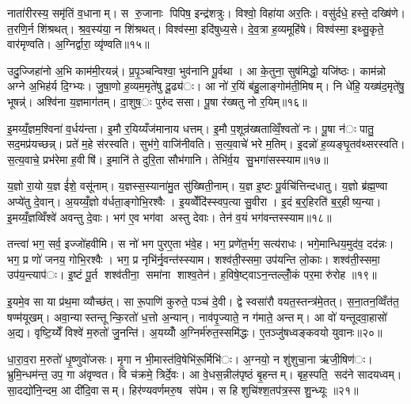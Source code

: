 नाता॑रीरस्य॒ समृ॑तिं व॒धानाम्। स रु॒जानाः पिपिष॒ इन्द्र॑शत्रुः। विश्वो॒ विहा॑या अर॒तिः। वसु॑र्दधे॒ हस्ते॒ दख्षि॑णे। त॒रणि॒र्न शि॑श्रथत्। श्र॒व॒स्य॑या॒ न शि॑श्रथत्। विश्व॑स्मा॒ इदि॑षुध्य॒से। दे॒व॒त्रा ह॒व्यमूहि॑षे। विश्व॑स्मा॒ इथ्सु॒कृते॒ वार॑मृण्वति। अ॒ग्निर्द्वारा॒ व्यृ॑ण्वति॥१५॥

उदु॒ज्जिहा॑नो अ॒भि काम॑मी॒रयन्न्॑। प्र॒पृ॒ञ्चन्विश्वा॒ भुव॑नानि पू॒र्वथा। आ के॒तुना॒ सुष॑मिद्धो॒ यजि॑ष्ठः। काम॑न्नो अग्ने अ॒भिह॑र्य दि॒ग्भ्यः। जु॒षा॒णो ह॒व्यम॒मृते॑षु दू॒ढ्य॑ः। आ नो॑ र॒यिं ब॑हु॒लाङ्गोम॑ती॒मिषम्। नि धे॑हि॒ यख्ष॑द॒मृते॑षु॒ भूषन्न्॑। अश्वि॑ना य॒ज्ञमाग॑तम्। दा॒शुष॒ः पुरु॑दससा। पू॒षा र॑ख्षतु नो र॒यिम्॥१६॥

इ॒मय्यँ॒ज्ञम॒श्विना॑ व॒र्धय॑न्ता। इ॒मौ र॒यिय्यँज॑मानाय धत्तम्। इ॒मौ प॒शून्र॑ख्षताव्विँ॒श्वतो॑ नः। पू॒षा न॑ः पातु॒ सद॒मप्र॑यच्छन्न्। प्रते॑ म॒हे स॑रस्वति। सुभ॑गे॒ वाजि॑नीवति। स॒त्य॒वाचे॑ भरे म॒तिम्। इ॒दन्नो॑ ह॒व्यङ्घृ॒तव॑थ्सरस्वति। स॒त्य॒वाचे॒ प्रभ॑रेमा ह॒वीषि॑। इ॒मानि॑ ते दुरि॒ता सौभ॑गानि। तेभि॑र्व॒य सु॒भगा॑सस्स्याम॥१७॥


य॒ज्ञो रा॒यो य॒ज्ञ ई॑शे॒ वसू॑नाम्। य॒ज्ञस्स॒स्याना॑मु॒त सु॑ख्षिती॒नाम्। य॒ज्ञ इ॒ष्टः पू॒र्वचि॑त्तिन्दधातु। य॒ज्ञो ब्र॑ह्म॒ण्वा अप्ये॑तु दे॒वान्। अ॒यय्यँ॒ज्ञो व॑र्धता॒ङ्गोभि॒रश्वैः। इ॒यव्वेँदि॑स्स्वप॒त्या सु॒वीरा। इ॒दं ब॒र्॒हिरति॑ ब॒र्॒हीष्य॒न्या। इ॒मय्यँ॒ज्ञव्विँश्वे॑ अवन्तु दे॒वाः। भग॑ ए॒व भग॑वा अस्तु देवाः। तेन॑ व॒यं भग॑वन्तस्स्याम॥१८॥

तन्त्वा॑ भग॒ सर्व॒ इज्जो॑हवीमि। स नो॑ भग पुरए॒ता भ॑वे॒ह। भग॒ प्रणे॑त॒र्भग॒ सत्य॑राधः। भगे॒मान्धिय॒मुद॑व॒ दद॑न्नः। भग॒ प्र णो॑ जनय॒ गोभि॒रश्वैः। भग॒ प्र नृभि॑र्नृ॒वन्त॑स्स्याम। शश्व॑ती॒स्समा॒ उप॑यन्ति लो॒काः। शश्व॑ती॒स्समा॒ उप॑य॒न्त्याप॑ः। इ॒ष्टं पू॒र्त शश्व॑तीना॒ समा॑ना शाश्व॒तेन॑। ह॒विषे॒ष्ट्वाऽन॒न्तल्लोँ॒कं पर॒मा रु॑रोह ॥१९॥

इ॒यमे॒व सा या प्र॑थ॒मा व्यौच्छ॑त्। सा रू॒पाणि॑ कुरुते॒ पञ्च॑ दे॒वी। द्वे स्वसा॑रौ वयत॒स्तन्त्र॑मे॒तत्। स॒ना॒तन॒व्विँत॑त॒ षण्म॑यूखम्। अवा॒न्यास्तन्तून्कि॒रतो॑ ध॒त्तो अ॒न्यान्। नाव॑पृ॒ज्याते॒ न ग॑माते॒ अन्तम्। आ वो॑ यन्तूदवा॒हासो॑ अ॒द्य। वृष्टि॒य्येँ विश्वे॑ म॒रुतो॑ जु॒नन्ति॑। अ॒यय्योँ अ॒ग्निर्म॑रुत॒स्समि॑द्धः। ए॒तञ्जु॑षध्वङ्कवयो युवानः॥२०॥

धा॒रा॒व॒रा म॒रुतो॑ धृ॒ष्णुवो॑जसः। मृ॒गा न भी॒मास्त॑वि॒षेभि॑रू॒र्मिभि॑ः। अ॒ग्नयो॒ न शु॑शुचा॒ना ऋ॑जी॒षिण॑ः। भ्रुमि॒न्धम॑न्त॒ उप॒ गा अ॑वृण्वत। वि च॑क्रमे॒ त्रिर्दे॒वः। आ वे॒धस॒न्नील॑पृष्ठं बृ॒हन्तम्। बृह॒स्पति॒ सद॑ने सादयध्वम्। सा॒दद्यो॑नि॒न्दम॒ आ दी॑दि॒वासम्। हिर॑ण्यवर्णमरु॒ष स॑पेम। स हि शुचि॑श्श॒तप॑त्र॒स्स शु॒न्ध्यूः ॥२१॥

